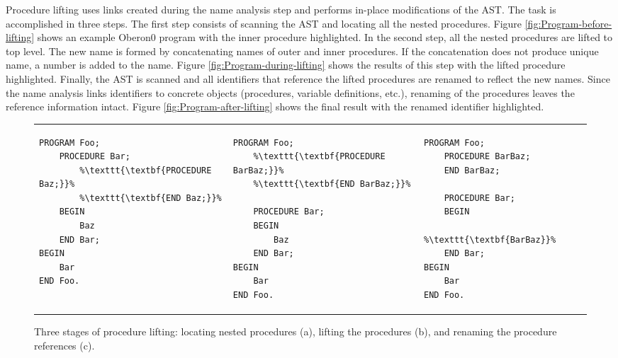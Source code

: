 Procedure lifting uses links created during the name analysis step
and performs in-place modifications of the AST. The task is accomplished
in three steps. The first step consists of scanning the AST and locating
all the nested procedures. Figure \ref{fig:Program-before-lifting}
shows an example Oberon0 program with the inner procedure highlighted.
In the second step, all the nested procedures are lifted to top level.
The new name is formed by concatenating names of outer and inner procedures.
If the concatenation does not produce unique name, a number is added
to the name. Figure \ref{fig:Program-during-lifting} shows the results
of this step with the lifted procedure highlighted. Finally, the AST
is scanned and all identifiers that reference the lifted procedures
are renamed to reflect the new names. Since the name analysis links
identifiers to concrete objects (procedures, variable definitions,
etc.), renaming of the procedures leaves the reference information
intact. Figure \ref{fig:Program-after-lifting} shows the final result
with the renamed identifier highlighted.

\begin{figure}[!h]
\begin{tabular}{>{\centering}p{}>{\centering}p{}>{\centering}p{}}
{\scriptsize }
\begin{lstlisting}[basicstyle={\footnotesize\ttfamily},escapechar={\%},showlines=true]
PROGRAM Foo;
    PROCEDURE Bar;
        %\texttt{\textbf{PROCEDURE Baz;}}%
        %\texttt{\textbf{END Baz;}}%
    BEGIN
        Baz
    END Bar;
BEGIN
    Bar
END Foo.
 
\end{lstlisting}
{\scriptsize \par}

\subfloat[\label{fig:Program-before-lifting}]{} & {\scriptsize }
\begin{lstlisting}[basicstyle={\footnotesize\ttfamily},escapechar={\%}]
PROGRAM Foo;
    %\texttt{\textbf{PROCEDURE BarBaz;}}%
    %\texttt{\textbf{END BarBaz;}}%
 
    PROCEDURE Bar;
    BEGIN
        Baz
    END Bar;
BEGIN
    Bar
END Foo.
\end{lstlisting}
{\scriptsize \par}

\subfloat[\label{fig:Program-during-lifting}]{} & {\scriptsize }
\begin{lstlisting}[basicstyle={\footnotesize\ttfamily},escapechar={\%}]
PROGRAM Foo;
    PROCEDURE BarBaz;
    END BarBaz;
 
    PROCEDURE Bar;
    BEGIN
        %\texttt{\textbf{BarBaz}}%
    END Bar;
BEGIN
    Bar
END Foo.
\end{lstlisting}
{\scriptsize \par}

\subfloat[\label{fig:Program-after-lifting}]{}\tabularnewline
\end{tabular}

\caption{Three stages of procedure lifting: locating nested procedures (a),
lifting the procedures (b), and renaming the procedure references
(c).}
\end{figure}



